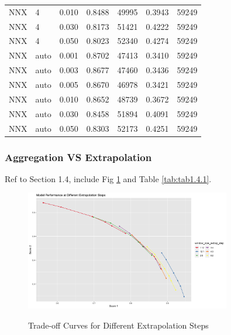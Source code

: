\documentclass{article}
\begin{document}
\begin{longtable}[htbp]{l|l|l|*{4}{c}}
      NNX & 4 & 0.010 & 0.8488 & 49995 & 0.3943 & 59249\\
      NNX & 4 & 0.030 & 0.8173 & 51421 & 0.4222 & 59249\\
      NNX & 4 & 0.050 & 0.8023 & 52340 & 0.4274 & 59249\\
      NNX & auto & 0.001 & 0.8702 & 47413 & 0.3410 & 59249\\
      NNX & auto & 0.003 & 0.8677 & 47460 & 0.3436 & 59249\\
      NNX & auto & 0.005 & 0.8670 & 46978 & 0.3421 & 59249\\
      NNX & auto & 0.010 & 0.8652 & 48739 & 0.3672 & 59249\\
      NNX & auto & 0.030 & 0.8458 & 51894 & 0.4091 & 59249\\
      NNX & auto & 0.050 & 0.8303 & 52173 & 0.4251 & 59249\\
\end{longtable}

\subsubsection{Aggregation VS Extrapolation}
Ref to Section 1.4, include Fig \ref{fig:fig1.4.1} and Table \ref{tab:tab1.4.1}.

\begin{figure}[htbp]
    \caption{Trade-off Curves for Different Extrapolation Steps}
    \centering
    \includegraphics[width = 0.8\textwidth]{images/ModelPerformanceatDifferentExtrapolationSteps.png}
    \label{fig:fig1.4.1}
\end{figure}
\end{document}
